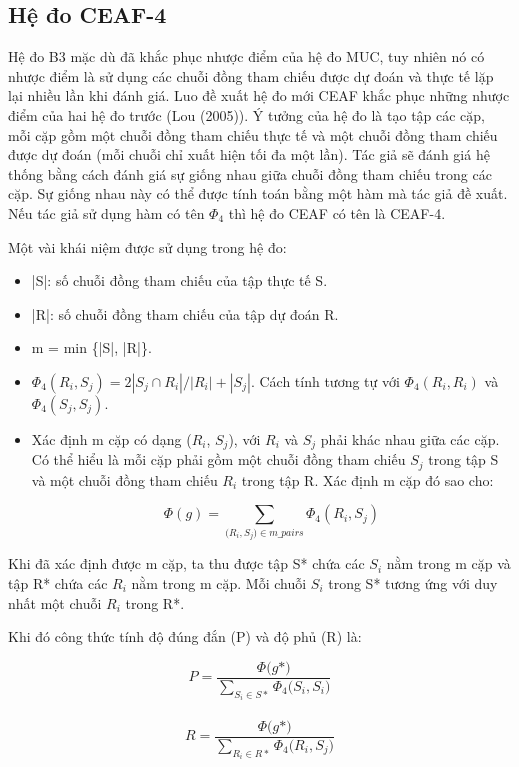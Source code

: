 \documentclass[12pt]{report}
\begin{document}
					\subsection*{Hệ đo CEAF-4}
					\par Hệ đo B3 mặc dù đã khắc phục nhược điểm của hệ đo MUC, tuy nhiên nó có nhược điểm là sử dụng các chuỗi đồng tham chiếu được dự đoán và thực tế lặp lại nhiều lần khi đánh giá. Luo đề xuất hệ đo mới CEAF khắc phục những nhược điểm của hai hệ đo trước (Lou (2005)\cite{lou05}). Ý tưởng của hệ đo là tạo tập các cặp, mỗi cặp gồm một chuỗi đồng tham chiếu thực tế và một chuỗi đồng tham chiếu được dự đoán (mỗi chuỗi chỉ xuất hiện tối đa một lần). Tác giả sẽ đánh giá hệ thống bằng cách đánh giá sự giống nhau giữa chuỗi đồng tham chiếu trong các cặp. Sự giống nhau này có thể được tính toán bằng một hàm mà tác giả đề xuất. Nếu tác giả sử dụng hàm có tên $\Phi_4$ thì hệ đo CEAF có tên là CEAF-4.
					\par Một vài khái niệm được sử dụng trong hệ đo:
					\begin{itemize}
					\item{|S|: số chuỗi đồng tham chiếu của tập thực tế S.}
					\item{|R|: số chuỗi đồng tham chiếu của tập dự đoán R.}
					\item{m = min \{|S|, |R|\}.}
					\item{$\Phi_4(R_i,S_j) = 2 |S_j \cap R_i|/ |R_i| + |S_j|$. Cách tính tương tự với $\Phi_4(R_i,R_i)$ và $\Phi_4(S_j,S_j)$.}  
					\item{Xác định m cặp có dạng ($R_i$, $S_j$), với $R_i$ và $S_j$ phải khác nhau giữa các cặp. Có thể hiểu là mỗi cặp phải gồm một chuỗi đồng tham chiếu $S_j$ trong tập S và một chuỗi đồng tham chiếu $R_i$ trong tập R. Xác định m cặp đó sao cho: 
					\begin{center}
						\begin{equation*}
							\Phi(g) = \sum_{\big(R_i,S_j) \in m\_pairs} \Phi_4(R_i,S_j)
						\end{equation*}
					\end{center}}
				\end{itemize}
				\par Khi đã xác định được m cặp, ta thu được tập S* chứa các $S_i$ nằm trong m cặp và tập R* chứa các $R_i$ nằm trong m cặp. Mỗi chuỗi $S_i$ trong S* tương ứng với duy nhất một chuỗi $R_i$ trong R*.
				\par Khi đó công thức tính độ đúng đắn (P) và độ phủ (R) là:						
					\begin{center}
						\begin{equation*}
							P = \frac{\Phi \big(g*)}{\sum_{S_i \in S*}\Phi_4 \big(S_i, S_i)}
						\end{equation*}
						\\
						\begin{equation*}
							R = \frac{\Phi \big(g*)}{\sum_{R_i \in R*}\Phi_4 \big(R_i, S_j)}
						\end{equation*}					
					\end{center}
\end{document}
